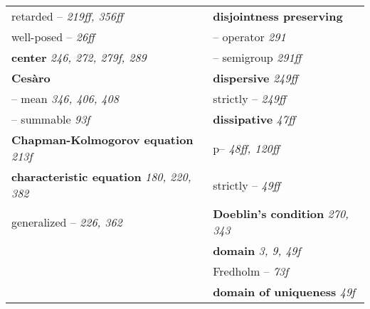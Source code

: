 \begin{longtable}{p{}p{}}
\quad retarded -- \textit{219ff, 356ff} & \textbf{disjointness preserving} \\
\quad well-posed -- \textit{26ff} & \quad -- operator \textit{291} \\
\textbf{center} \textit{246, 272, 279f, 289} & \quad -- semigroup \textit{291ff} \\
\textbf{Cesàro} & \textbf{dispersive} \textit{249ff} \\
\quad -- mean \textit{346, 406, 408} & \quad strictly -- \textit{249ff} \\
\quad -- summable \textit{93f} & \textbf{dissipative} \textit{47ff} \\
\textbf{Chapman-Kolmogorov equation} \textit{213f} & \quad p-- \textit{48ff, 120ff} \\
\textbf{characteristic equation} \textit{180, 220, 382} & \quad strictly -- \textit{49ff} \\
\quad generalized -- \textit{226, 362} & \textbf{Doeblin's condition} \textit{270, 343} \\
& \textbf{domain} \textit{3, 9, 49f} \\
& \quad Fredholm -- \textit{73f} \\
& \textbf{domain of uniqueness} \textit{49f} \\


\end{longtable}
